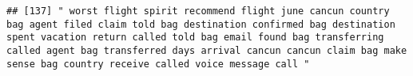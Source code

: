\documentclass[
]{article}
\begin{document}
\begin{verbatim}
## [137] " worst flight spirit recommend flight june cancun country bag agent filed claim told bag destination confirmed bag destination spent vacation return called told bag email found bag transferring called agent bag transferred days arrival cancun cancun claim bag make sense bag country receive called voice message call "                                                                                                                                                                                                                                                                                                                                                                                                                                                                                                                                                                                                                                                                                                                                                                                                                                                                                                                                                                                                                                                                                                                                                                                                                                                                                                                                                                                                                                                                 

\end{verbatim}
\end{document}
